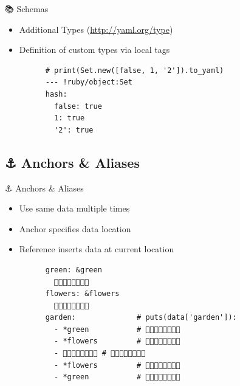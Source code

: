 \documentclass{beamer}
\newcommand{\code}[1]{
  \codebox{\texttt|#1|}
}
\begin{document}
\begin{frame}{📚 Schemas}
  \newpage
  \begin{itemize}
    \item Additional Types (\textcolor{orange}{\url{http://yaml.org/type}})
    \item Definition of custom types via local tags\\[0.5cm]
    \begin{verbatim}
      # print(Set.new([false, 1, '2']).to_yaml)
      --- !ruby/object:Set
      hash:
        false: true
        1: true
        '2': true
    \end{verbatim}
  \end{itemize}
\end{frame}

\subsection{⚓️ Anchors \& Aliases}

\begin{frame}[fragile]{⚓️ Anchors \& Aliases}
  \begin{itemize}
    \item Use same data multiple times
    \item Anchor \code{&name} specifies data location
    \item Reference \code{*name} inserts data at current location~\\[0.5cm]
    \begin{verbatim}
      green: &green
        🌳🌱🌿🌱🌿🌱🌿🌳
      flowers: &flowers
        🌳🌸🌼🌻🌺🌼🌸🌳
      garden:              # puts(data['garden']):
        - *green           # 🌳🌱🌿🌱🌿🌱🌿🌳
        - *flowers         # 🌳🌸🌼🌻🌺🌼🌸🌳
        - 🌳🌱🐞🌱🌱🐛🌱🌳 # 🌳🌱🐞🌱🌱🐛🌱🌳
        - *flowers         # 🌳🌸🌼🌻🌺🌼🌸🌳
        - *green           # 🌳🌱🌿🌱🌿🌱🌿🌳
    \end{verbatim}
  \end{itemize}
\end{frame}
\end{document}
